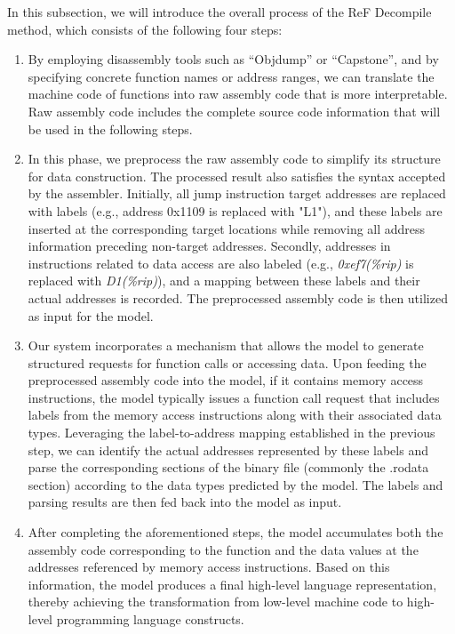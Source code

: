In this subsection, we will introduce the overall process of the ReF Decompile method, which consists of the following four steps:

\begin{enumerate}
    \item {}
    By employing disassembly tools such as ``Objdump'' or ``Capstone'', and by specifying concrete function names or address ranges, we can translate the machine code of functions into raw assembly code that is more interpretable.
    Raw assembly code includes the complete source code information that will be used in the following steps.

    \item {}
    In this phase, we preprocess the raw assembly code to simplify its structure for data construction. 
    The processed result also satisfies the syntax accepted by the assembler.
    Initially, all jump instruction target addresses are replaced with labels (e.g., address 0x1109 is replaced with "L1"), and these labels are inserted at the corresponding target locations while removing all address information preceding non-target addresses. 
    Secondly, addresses in instructions related to data access are also labeled (e.g., \textit{0xef7(\%rip)} is replaced with \textit{D1(\%rip)}), and a mapping between these labels and their actual addresses is recorded.
    The preprocessed assembly code is then utilized as input for the model.

    \item {}
    Our system incorporates a mechanism that allows the model to generate structured requests for function calls or accessing data.
    Upon feeding the preprocessed assembly code into the model, if it contains memory access instructions, the model typically issues a function call request that includes labels from the memory access instructions along with their associated data types.
    Leveraging the label-to-address mapping established in the previous step, we can identify the actual addresses represented by these labels and parse the corresponding sections of the binary file (commonly the .rodata section) according to the data types predicted by the model. The labels and parsing results are then fed back into the model as input.

    \item {}
    After completing the aforementioned steps, the model accumulates both the assembly code corresponding to the function and the data values at the addresses referenced by memory access instructions. Based on this information, the model produces a final high-level language representation, thereby achieving the transformation from low-level machine code to high-level programming language constructs.

\end{enumerate}

